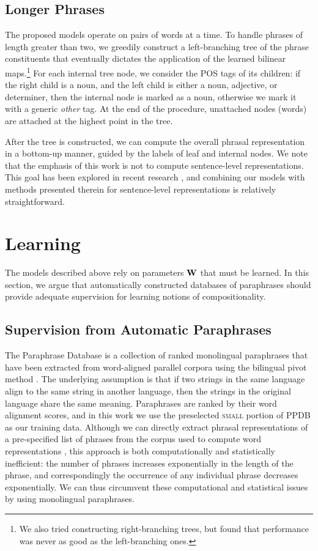 \documentclass[11pt]{article}
\newcommand{\bW}{{\bf W}}
\begin{document}
\subsection{Longer Phrases}
\label{sec:longer-phrases}

The proposed models operate on pairs of words at a time. 
To handle phrases of length greater than two, we greedily construct a left-branching tree of the phrase constituents that eventually dictates the application of the learned bilinear maps.\footnote{We also tried constructing right-branching trees, but found that performance was never as good as the left-branching ones.}
For each internal tree node, we consider the POS tags of its children: if the right child is a noun, and the left child is either a noun, adjective, or determiner, then the internal node is marked as a noun, otherwise we mark it with a generic \emph{other} tag. 
At the end of the procedure, unattached nodes (words) are attached at the highest point in the tree. 

After the tree is constructed, we can compute the overall phrasal representation in a bottom-up manner, guided by the labels of leaf and internal nodes.
We note that the emphasis of this work is not to compute sentence-level representations. 
This goal has been explored in recent research \cite{Le2014,Kalchbrenner2014}, and combining our models with methods presented therein for sentence-level representations is relatively straightforward.  

\section{Learning}
\label{sec:regularization}
The models described above rely on parameters $\bW$ that must be learned. 
In this section, we argue that automatically constructed databases of paraphrases should provide adequate supervision for learning notions of compositionality. 

\subsection{Supervision from Automatic Paraphrases}
\label{sec:ppdb}

The Paraphrase Database \cite[PPDB]{Ganitkevich2013} is a collection of ranked monolingual paraphrases that have been extracted from word-aligned parallel corpora using the bilingual pivot method \cite{Bannard2005}. 
The underlying assumption is that if two strings in the same language align to the same string in another language, then the strings in the original language share the same meaning. 
Paraphrases are ranked by their word alignment scores, and in this work we use the preselected \textsc{small} portion of PPDB as our training data.
Although we can directly extract phrasal representations of a pre-specified list of phrases from the corpus used to compute word representations \cite{Baroni2010}, this approach is both computationally and statistically inefficient: the number of phrases increases exponentially in the length of the phrase, and correspondingly the occurrence of any individual phrase decreases exponentially. 
We can thus circumvent these computational and statistical issues by using monolingual paraphrases.  
\end{document}
